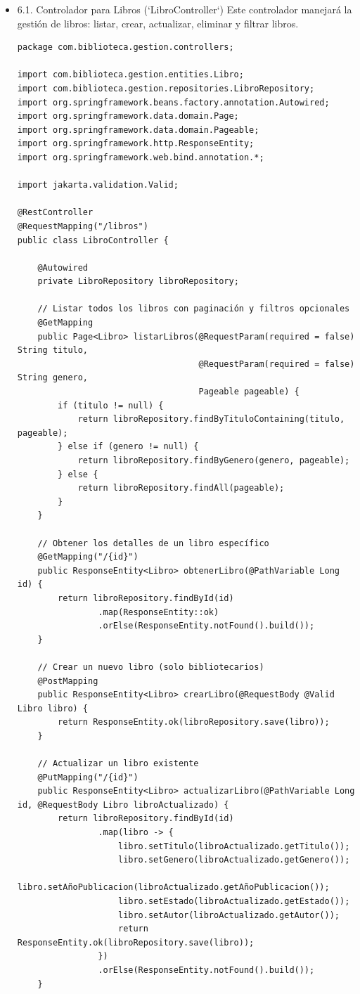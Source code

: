 \documentclass[11pt]{article}
\begin{document}
\begin{itemize}
\item 6.1. Controlador para Libros (`LibroController`)
\label{sec:orgd4baa81}
Este controlador manejará la gestión de libros: listar, crear, actualizar, eliminar y filtrar libros.

\begin{verbatim}
package com.biblioteca.gestion.controllers;

import com.biblioteca.gestion.entities.Libro;
import com.biblioteca.gestion.repositories.LibroRepository;
import org.springframework.beans.factory.annotation.Autowired;
import org.springframework.data.domain.Page;
import org.springframework.data.domain.Pageable;
import org.springframework.http.ResponseEntity;
import org.springframework.web.bind.annotation.*;

import jakarta.validation.Valid;

@RestController
@RequestMapping("/libros")
public class LibroController {

    @Autowired
    private LibroRepository libroRepository;

    // Listar todos los libros con paginación y filtros opcionales
    @GetMapping
    public Page<Libro> listarLibros(@RequestParam(required = false) String titulo,
                                    @RequestParam(required = false) String genero,
                                    Pageable pageable) {
        if (titulo != null) {
            return libroRepository.findByTituloContaining(titulo, pageable);
        } else if (genero != null) {
            return libroRepository.findByGenero(genero, pageable);
        } else {
            return libroRepository.findAll(pageable);
        }
    }

    // Obtener los detalles de un libro específico
    @GetMapping("/{id}")
    public ResponseEntity<Libro> obtenerLibro(@PathVariable Long id) {
        return libroRepository.findById(id)
                .map(ResponseEntity::ok)
                .orElse(ResponseEntity.notFound().build());
    }

    // Crear un nuevo libro (solo bibliotecarios)
    @PostMapping
    public ResponseEntity<Libro> crearLibro(@RequestBody @Valid Libro libro) {
        return ResponseEntity.ok(libroRepository.save(libro));
    }

    // Actualizar un libro existente
    @PutMapping("/{id}")
    public ResponseEntity<Libro> actualizarLibro(@PathVariable Long id, @RequestBody Libro libroActualizado) {
        return libroRepository.findById(id)
                .map(libro -> {
                    libro.setTitulo(libroActualizado.getTitulo());
                    libro.setGenero(libroActualizado.getGenero());
                    libro.setAñoPublicacion(libroActualizado.getAñoPublicacion());
                    libro.setEstado(libroActualizado.getEstado());
                    libro.setAutor(libroActualizado.getAutor());
                    return ResponseEntity.ok(libroRepository.save(libro));
                })
                .orElse(ResponseEntity.notFound().build());
    }


\end{verbatim}
\end{itemize}
\end{document}
